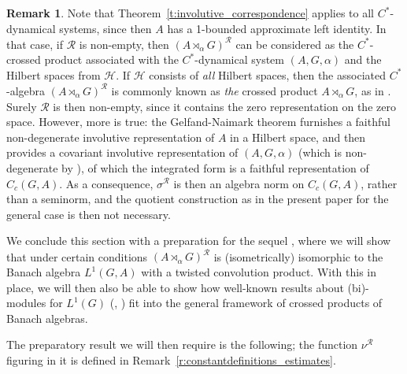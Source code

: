 \documentclass{amsart}
\theoremstyle{plain}
\theoremstyle{definition}
\newtheorem{remark}[theorem]{Remark}
\numberwithin{equation}{section}
\begin{document}
\begin{remark}\label{r:cstar_remark}
Note that Theorem~\ref{t:involutive_correspondence} applies to all $C^*$-dynamical systems, since then $A$ has a 1-bounded approximate left identity. In that case, if $\mathcal R$ is non-empty, then ${(A {\rtimes}_\alpha G)^\mathcal{R}}$ can be considered as the $C^*$-crossed product associated with the $C^*$-dynamical system ${(A,G,\alpha)}$ and the Hilbert spaces from $\mathcal H$. If $\mathcal H$ consists of \emph{all} Hilbert spaces, then the associated $C^*$-algebra ${(A {\rtimes}_\alpha G)^\mathcal{R}}$ is commonly known as \emph{the} crossed product $A{\rtimes}_\alpha G$, as in \cite{williams}. Surely ${\mathcal R}$ is then non-empty, since it contains the zero representation on the zero space. However, more is true: the Gelfand-Naimark theorem furnishes a faithful non-degenerate involutive representation of $A$ in a Hilbert space, and then \cite[Lemma~2.26]{williams} provides a covariant involutive representation of ${(A,G,\alpha)}$ (which is non-degenerate by \cite[Lemma~2.17]{williams}), of which the integrated form is a faithful representation of $C_c(G,A)$. As a consequence, ${\sigma^{\mathcal R}}$ is then an algebra norm on $C_c(G,A)$, rather than a seminorm, and the quotient construction as in the present paper for the general case is then not necessary.
\end{remark}

We conclude this section with a preparation for the sequel \cite{crossedtwo}, where we will show that under certain conditions ${(A {\rtimes}_\alpha G)^\mathcal{R}}$ is (isometrically) isomorphic to the Banach algebra $L^1(G,A)$ with a twisted convolution product. With this in place, we will then also be able to show how well-known results about (bi)-modules for $L^1(G)$ (\cite[Assertion~VI.1.32]{helemskii}, \cite[Proposition~2.1]{johnson}) fit into the general framework of crossed products of Banach algebras.

The preparatory result we will then require is the following; the function ${\nu^{\mathcal R}}$ figuring in it is defined in Remark~\ref{r:constantdefinitions_estimates}.
\end{document}
